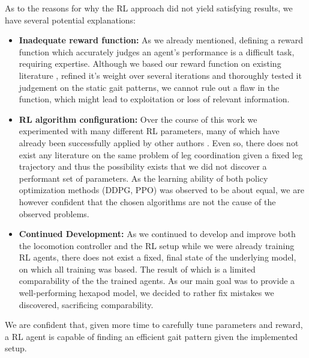 As to the reasons for why the RL approach did not yield satisfying results, we have several potential explanations:
\begin{itemize}
	\item \textbf{Inadequate reward function: } As we already mentioned, defining a reward function which accurately judges an agent's performance is a difficult task, requiring expertise.
	Although we based our reward function on existing literature \parencite{trotta2022walking, schilling2021decentralized}, refined it's weight over several iterations and thoroughly tested it judgement on the static gait patterns, we cannot rule out a flaw in the function, which might lead to exploitation or loss of relevant information.
	
	\item \textbf{RL algorithm configuration: } Over the course of this work we experimented with many different RL parameters, many of which have already been successfully applied by other authors \parencite{matlabDDPGExample, matlabPPOExample, trotta2022walking}.
	Even so, there does not exist any literature on the same problem of leg coordination given a fixed leg trajectory and thus the possibility exists that we did not discover a performant set of parameters.
	As the learning ability of both policy optimization methods (DDPG, PPO) was observed to be about equal, we are however confident that the chosen algorithms are not the cause of the observed problems.
	
	\item \textbf{Continued Development: } As we continued to develop and improve both the locomotion controller and the RL setup while we were already training RL agents, there does not exist a fixed, final state of the underlying model, on which all training was based.
	The result of which is a limited comparability of the the trained agents.
	As our main goal was to provide a well-performing hexapod model, we decided to rather fix mistakes we discovered, sacrificing comparability.
	
\end{itemize}
We are confident that, given more time to carefully tune parameters and reward, a RL agent is capable of finding an efficient gait pattern given the implemented setup.

